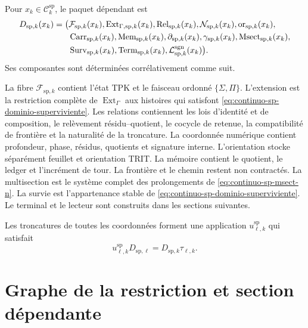 Pour \(x_k\in\mathcal C_k^{\mathrm{sp}}\), le paquet dépendant est
\begin{equation}
\label{eq:continuo-sp-d13}
\begin{aligned}
 D_{\mathrm{sp},k}(x_k)=\bigl(&
 \mathcal F_{\mathrm{sp},k}(x_k),
 \operatorname{Ext}_{\Gamma,\mathrm{sp},k}(x_k),
 \operatorname{Rel}_{\mathrm{sp},k}(x_k),
 \mathcal N_{\mathrm{sp},k}(x_k),
 \operatorname{or}_{\mathrm{sp},k}(x_k),\\
 &\operatorname{Carr}_{\mathrm{sp},k}(x_k),
 \operatorname{Mem}_{\mathrm{sp},k}(x_k),
 \partial_{\mathrm{sp},k}(x_k),
 \gamma_{\mathrm{sp},k}(x_k),
 \operatorname{Msect}_{\mathrm{sp},k}(x_k),\\
 &\operatorname{Surv}_{\mathrm{sp},k}(x_k),
 \operatorname{Term}_{\mathrm{sp},k}(x_k),
 \mathcal L^{\rm sgn}_{\mathrm{sp},k}(x_k)\bigr).
\end{aligned}
\end{equation}
Ses composantes sont déterminées corrélativement comme suit.

La fibre \(\mathcal F_{\mathrm{sp},k}\) contient l'état TPK et le faisceau
ordonné \(\{\Sigma,\Pi\}\). L'extension est la restriction complète de
\(\operatorname{Ext}_\Gamma\) aux histoires qui satisfont
\eqref{eq:continuo-sp-dominio-superviviente}. Les relations contiennent les
lois d'identité et de composition, le relèvement résidu--quotient, le cocycle de
retenue, la compatibilité de frontière et la naturalité de la troncature. La
coordonnée numérique contient profondeur, phase, résidus, quotients et signature
interne. L'orientation stocke séparément feuillet et orientation TRIT. La
mémoire contient le quotient, le ledger et l'incrément de tour. La
frontière et le chemin restent non contractés. La multisection est le système
complet des prolongements de \eqref{eq:continuo-sp-msect-n}. La
survie est l'appartenance stable de
\eqref{eq:continuo-sp-dominio-superviviente}. Le terminal et le lecteur sont
construits dans les sections suivantes.

Les troncatures de toutes les coordonnées forment une application
\(u^{\mathrm{sp}}_{\ell,k}\) qui satisfait
\begin{equation}
\label{eq:continuo-sp-d-naturalidad}
 u^{\mathrm{sp}}_{\ell,k}D_{\mathrm{sp},\ell}
 =D_{\mathrm{sp},k}\tau_{\ell,k}.
\end{equation}

\section{Graphe de la restriction et section dépendante}

